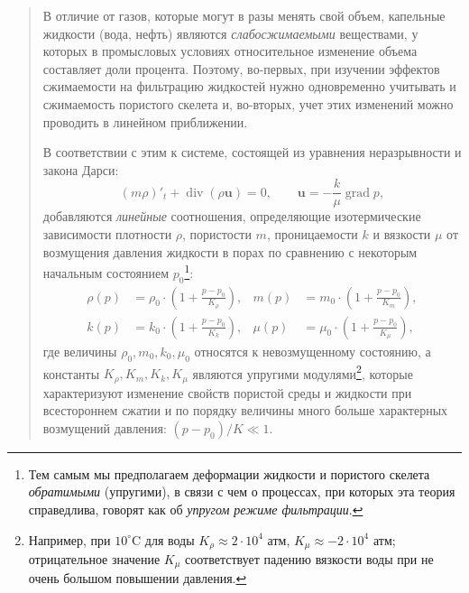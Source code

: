 \documentclass[12pt,a4paper]{article}
\DeclareMathOperator{\grad}{grad}
\DeclareMathOperator{\Div}{div}
\begin{document}
\begin{quote}\sloppy
В отличие от газов, которые могут в разы менять свой объем, капельные жидкости (вода, нефть) являются \textit{слабосжимаемыми} веществами, у которых в промысловых условиях относительное изменение объема составляет доли процента. Поэтому, во-первых, при изучении эффектов сжимаемости на фильтрацию жидкостей нужно одновременно учитывать и сжимаемость пористого скелета и, во-вторых, учет этих изменений можно проводить в линейном приближении.

В соответствии с этим к системе, состоящей из уравнения неразрывности и закона Дарси:
\[
(m\rho)'_t+\Div(\rho\boldsymbol u)=0,\qquad \boldsymbol u=-\frac{k}{\mu}\grad p,
\]
добавляются \textit{линейные} соотношения, определяющие изотермические зависимости плотности $\rho$, пористости $m$, проницаемости $k$ и вязкости $\mu$ от возмущения давления жидкости в порах по сравнению с некоторым начальным состоянием $p_0$\footnote{Тем самым мы предполагаем деформации жидкости и пористого скелета \textit{обратимыми} (упругими), в связи с чем о процессах, при которых эта теория справедлива, говорят как об \textit{упругом режиме фильтрации}.}:
\begin{equation}\begin{aligned}
\rho(p)&=\rho_0\cdot\left(1+\frac{p-p_0}{K_\rho}\right),&m(p)&=m_0\cdot\left(1+\frac{p-p_0}{K_m}\right),\\
k(p)&=k_0\cdot\left(1+\frac{p-p_0}{K_k}\right),&\mu(p)&=\mu_0\cdot\left(1+\frac{p-p_0}{K_\mu}\right),
\end{aligned}\tag{12.1}\label{q8:eq-12-1}\end{equation}
где величины $\rho_0,m_0,k_0,\mu_0$ относятся к невозмущенному состоянию, а константы $K_\rho,K_m,K_k,K_\mu$ являются упругими модулями\footnote{Например, при $10^\circ$C для воды $K_\rho\approx2\cdot10^4$ атм, $K_\mu\approx-2\cdot10^4$ атм; отрицательное значение $K_\mu$ соответствует падению вязкости воды при не очень большом повышении давления.}, которые характеризуют изменение свойств пористой среды и жидкости при всестороннем сжатии и по порядку величины много больше характерных возмущений давления: $(p-p_0)/K\ll1$.

\setcounter{footnote}{0}
\par\nobreak{}\par
\end{quote}
\end{document}
